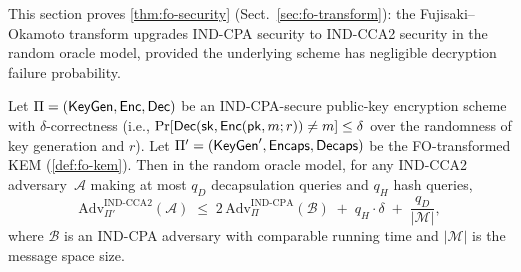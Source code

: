 This section proves \cref{thm:fo-security}
(Sect.~\ref{sec:fo-transform}): the Fujisaki--Okamoto
transform upgrades IND-CPA security to IND-CCA2 security in
the random oracle model, provided the underlying scheme has
negligible decryption failure probability.

\begin{theorem}
\label{thm:fo-app}
Let $\Pi = (\mathsf{KeyGen}, \mathsf{Enc}, \mathsf{Dec})$ be an IND-CPA-secure
public-key encryption scheme with $\delta$-correctness
(i.e., $\Pr[\mathsf{Dec}(\mathsf{sk}, \mathsf{Enc}(\mathsf{pk}, m; r)) \neq m]
\leq \delta$ over the randomness of key generation and $r$).
Let $\Pi' = (\mathsf{KeyGen}', \mathsf{Encaps}, \mathsf{Decaps})$ be the
FO-transformed KEM (\cref{def:fo-kem}).  Then in the random
oracle model, for any IND-CCA2 adversary~$\mathcal{A}$
making at most $q_D$ decapsulation queries and $q_H$ hash
queries,
\begin{equation}
\mathrm{Adv}^{\mathrm{IND\text{-}CCA2}}_{\Pi'}(\mathcal{A})
\;\leq\;
2\,\mathrm{Adv}^{\mathrm{IND\text{-}CPA}}_{\Pi}(\mathcal{B})
\;+\; q_H \cdot \delta
\;+\; \frac{q_D}{|\mathcal{M}|},
\end{equation}
where $\mathcal{B}$ is an IND-CPA adversary with comparable
running time and $|\mathcal{M}|$ is the message space size.
\end{theorem}

